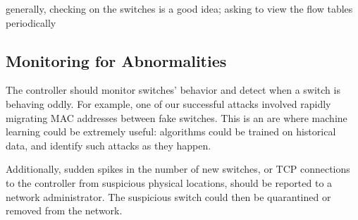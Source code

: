 
generally, checking on the switches is a good idea; asking to view the flow tables periodically

\subsection{Monitoring for Abnormalities}

The controller should monitor switches' behavior and detect when a switch is behaving oddly. For example, one of our successful attacks involved rapidly migrating MAC addresses between fake switches. This is an are where machine learning could be extremely useful: algorithms could be trained on historical data, and identify such attacks as they happen. 

Additionally, sudden spikes in the number of new switches, or TCP connections to the controller from suspicious physical locations, should be reported to a network administrator. The suspicious switch could then be quarantined or removed from the network.